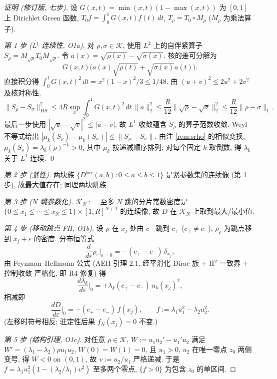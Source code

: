 \documentclass[UTF8]{ctexart}
\begin{document}
\begin{proof}[证明 (修订版, 七步)]
设 $G(x,t)=\min(x,t)(1-\max(x,t))$ 为 $[0,1]$ 上 Dirichlet Green 函数,
$T_0 f=\int_0^1 G(x,t)f(t)\,dt$, $T_\rho=T_0\circ M_\rho$ ($M_\rho$ 为乘法算子).

\emph{第 1 步 (L$^1$ 连续性, O1a).} 对 $\rho,\sigma\in\mathcal K$,
使用 $L^2$ 上的自伴紧算子 $S_\rho=M_{\sqrt\rho}T_0M_{\sqrt\rho}$.
令 $a(x)=\sqrt{\rho(x)}-\sqrt{\sigma(x)}$. 核的差可分解为
\[
 G(x,t)\bigl(a(x)\sqrt{\rho(t)}+\sqrt{\sigma(x)}a(t)\bigr).
\]
直接积分得 $\int_0^1G(x,t)^2\,dt=x^2(1-x)^2/3\le1/48$.
由 $(u+v)^2\le2u^2+2v^2$ 及核对称性,
\begin{equation}
 \|S_\rho-S_\sigma\|_{HS}^2
 \le4R\sup_x\int_0^1G(x,t)^2\,dt\,\|a\|_2^2
 \le\frac R{12}\|\sqrt\rho-\sqrt\sigma\|_2^2
 \le\frac R{12}\|\rho-\sigma\|_1.
\end{equation}
最后一步使用 $|\sqrt u-\sqrt v|^2\le|u-v|$.
故 $L^1$ 收敛蕴含 $S_\rho$ 的算子范数收敛. Weyl 不等式给出
$|\mu_k(S_\rho)-\mu_k(S_\sigma)|\le\|S_\rho-S_\sigma\|$.
由注 \ref{rem:srho} 的相似变换, $\mu_k(S_\rho)=\lambda_k(\rho)^{-1}>0$,
其中 $\mu_k$ 按递减顺序排列; 对每个固定 $k$ 取倒数, 得 $\lambda_k$ 关于 $L^1$ 连续. \qed

\emph{第 2 步 (紧性).} 两块族 $\{D^{bar}(a,b):0\le a\le b\le1\}$ 是紧参数集的连续像
(第 1 步), 故最大值存在; 同理两块阱族.

\emph{第 3 步 ($N$ 跳参数化).} $\mathcal K_N:=$ 至多 $N$ 跳的分片常数密度是
$\{0\le x_1\le\cdots\le x_N\le1\}\times[1,R]^{N+1}$ 的连续像, 故 $D$ 在 $\mathcal K_N$
上取到最大/最小值.

\emph{第 4 步 (移动跳点 FH, O1b).} 设 $\rho$ 在 $x_j$ 处由 $c_-$ 跳到 $c_+$
($c_+\neq c_-$), $\rho_\varepsilon$ 为跳点移到 $x_j+\varepsilon$ 的密度. 分布恒等式
\begin{equation}
	\frac{d}{d\varepsilon}\rho_\varepsilon\Big|_{\varepsilon=0}
	=-(c_+-c_-)\,\delta_{x_j},
\end{equation}
由 Feynman--Hellmann 公式 (AEH 引理 2.1, 经平滑化 Dirac 族 + H$^2$ 一致界 + 控制收敛
严格化, 即 R4 修复) 得
\begin{equation}
	\frac{d\lambda_k}{d\varepsilon}\Big|_0
	=+\lambda_k(c_+-c_-)\,u_k(x_j)^2,
\end{equation}
相减即
\begin{equation}
	\frac{dD}{d\varepsilon}\Big|_0=-(c_+-c_-)\,f(x_j),\qquad
	f:=\lambda_1u_1^2-\lambda_2u_2^2.
\end{equation}
(左移时符号相反; 驻定性后果 $f_N(x_j)=0$ 不变.)

\emph{第 5 步 (结构引理, O1c).} 对任意 $\rho\in\mathcal K$, $W:=u_1u_2'-u_1'u_2$ 满足
$W'=(\lambda_1-\lambda_2)\rho u_1u_2$, $W(0)=W(1)=0$, 且 $u_1>0$, $u_2$ 在唯一零点
$z_0$ 两侧变号, 得 $W<0$ on $(0,1)$, 故 $v:=u_2/u_1$ 严格递减. 于是
$f=\lambda_1u_1^2(1-(\lambda_2/\lambda_1)v^2)$ 至多两个零点, $\{f>0\}$ 为包含 $z_0$
的单区间.


\end{proof}
\end{document}
